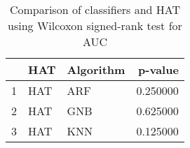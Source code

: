 \begin{table}
\footnotesize
\caption{Comparison of classifiers and HAT using Wilcoxon signed-rank test for AUC}
\label{tab:HAT wilcoxon AUC comparison}
\begin{tabular}{lllr}
\hline
 & HAT & Algorithm & p-value \\
\hline
1 & HAT & ARF & 0.250000 \\
2 & HAT & GNB & 0.625000 \\
3 & HAT & KNN & 0.125000 \\
\hline
\end{tabular}
\end{table}
